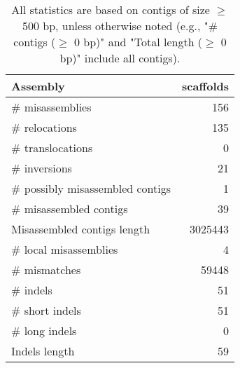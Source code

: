 \documentclass[12pt,a4paper]{article}
\begin{document}
\begin{table}[ht]
\begin{center}
\caption{All statistics are based on contigs of size $\geq$ 500 bp, unless otherwise noted (e.g., "\# contigs ($\geq$ 0 bp)" and "Total length ($\geq$ 0 bp)" include all contigs).}
\begin{tabular}{|l*{1}{|r}|}
\hline
Assembly & scaffolds \\ \hline
\# misassemblies & 156 \\ \hline
\hspace{5mm}\# relocations & 135 \\ \hline
\hspace{5mm}\# translocations & 0 \\ \hline
\hspace{5mm}\# inversions & 21 \\ \hline
\# possibly misassembled contigs & 1 \\ \hline
\# misassembled contigs & 39 \\ \hline
Misassembled contigs length & 3025443 \\ \hline
\# local misassemblies & 4 \\ \hline
\# mismatches & 59448 \\ \hline
\# indels & 51 \\ \hline
\hspace{5mm}\# short indels & 51 \\ \hline
\hspace{5mm}\# long indels & 0 \\ \hline
Indels length & 59 \\ \hline
\end{tabular}
\end{center}
\end{table}
\end{document}
